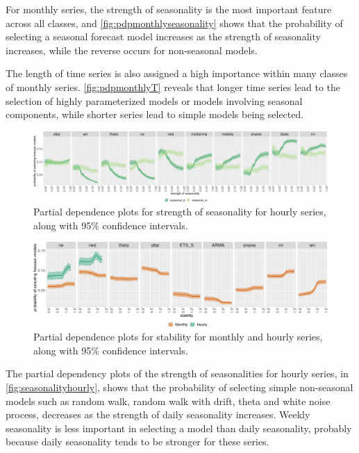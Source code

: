 \documentclass[11pt,a4paper,]{article}
\begin{document}
For monthly series, the strength of seasonality is the most important feature across all classes, and \autoref{fig:pdpmonthlyseasonality} shows that the probability of selecting a seasonal forecast model increases as the strength of seasonality increases, while the reverse occurs for non-seasonal models.

The length of time series is also assigned a high importance within many classes of monthly series. \autoref{fig:pdpmonthlyT} reveals that longer time series lead to the selection of highly parameterized models or models involving seasonal components, while shorter series lead to simple models being selected.

\begin{figure}[!tb]

{\centering \includegraphics[width=\textwidth]{figure/seasonalityhourly-1} 

}

\caption{Partial dependence plots for strength of seasonality for hourly series, along with 95\% confidence intervals.}\label{fig:seasonalityhourly}
\end{figure}

\begin{figure}[!tb]

{\centering \includegraphics[width=\textwidth]{figure/pdpmonthlyhourlyStability-1} 

}

\caption{Partial dependence plots for stability for monthly and hourly series, along with 95\% confidence intervals.}\label{fig:pdpmonthlyhourlyStability}
\end{figure}

The partial dependency plots of the strength of seasonalities for hourly series, in \autoref{fig:seasonalityhourly}, shows that the probability of selecting simple non-seasonal models such as random walk, random walk with drift, theta and white noise process, decreases as the strength of daily seasonality increases. Weekly seasonality is less important in selecting a model than daily seasonality, probably because daily seasonality tends to be stronger for these series.
\end{document}
